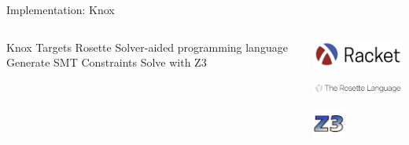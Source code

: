 \begin{frame}{Implementation: Knox}
\begin{columns}
  \centering
  \begin{outline}
  \1 Knox 
  \1 Targets Rosette \cite{Torlak2013Growing}
  \2 Solver-aided programming language
  \1 Generate SMT Constraints
  \2 Solve with Z3 \cite{De2008Z3}
  \end{outline}

  \centering
  \begin{center}
  \includegraphics[width=3cm]{racket_logo.png}

  \includegraphics[width=5cm]{rosette_logo.png}

  \includegraphics[width=1cm]{z3_logo.jpg}

  \end{center}
\end{columns}
\end{frame}
